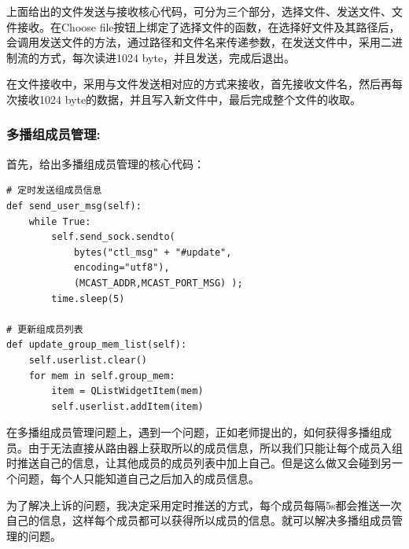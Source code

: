 \documentclass[UTF8]{ctexart}
\begin{document}
\par{上面给出的文件发送与接收核心代码，可分为三个部分，选择文件、发送文件、文件接收。在Choose file按钮上绑定了选择文件的函数，在选择好文件及其路径后，会调用发送文件的方法，通过路径和文件名来传递参数，在发送文件中，采用二进制流的方式，每次读进1024 byte，并且发送，完成后退出。}
\par{在文件接收中，采用与文件发送相对应的方式来接收，首先接收文件名，然后再每次接收1024 byte的数据，并且写入新文件中，最后完成整个文件的收取。}

\subsubsection{多播组成员管理:}{首先，给出多播组成员管理的核心代码：}
\par{
\begin{lstlisting}
# 定时发送组成员信息
def send_user_msg(self):
    while True:
        self.send_sock.sendto(
        	bytes("ctl_msg" + "#update",
        	encoding="utf8"), 
        	(MCAST_ADDR,MCAST_PORT_MSG) );
        time.sleep(5)
       
# 更新组成员列表
def update_group_mem_list(self):
    self.userlist.clear()
    for mem in self.group_mem:
        item = QListWidgetItem(mem)
        self.userlist.addItem(item)
\end{lstlisting}
}
\par{在多播组成员管理问题上，遇到一个问题，正如老师提出的，如何获得多播组成员。由于无法直接从路由器上获取所以的成员信息，所以我们只能让每个成员入组时推送自己的信息，让其他成员的成员列表中加上自己。但是这么做又会碰到另一个问题，每个人只能知道自己之后加入的成员信息。
}
\par{为了解决上诉的问题，我决定采用定时推送的方式，每个成员每隔5s都会推送一次自己的信息，这样每个成员都可以获得所以成员的信息。就可以解决多播组成员管理的问题。}
\end{document}
